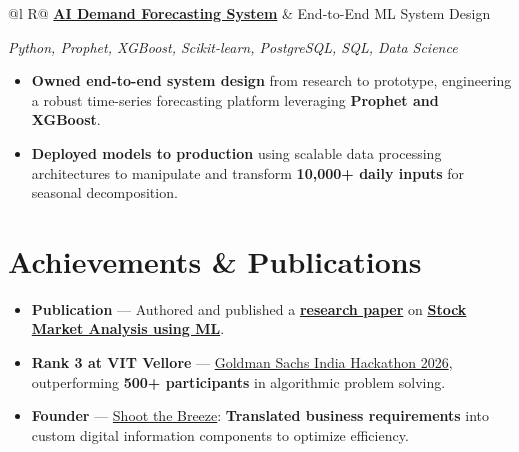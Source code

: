 \documentclass[a4paper,11pt]{article}
\newcommand{\subheading}[1]{\textbf{#1}}
\newcommand{\meta}[1]{{\fontsize{10}{12}\selectfont\textcolor[HTML]{3A3A3A}{#1}}}
\newcommand{\techstack}[1]{{\fontsize{10}{12}\selectfont\textcolor[HTML]{1A1A1A}{\textit{#1}}}}
\newcommand{\ulink}[2]{\href{#1}{#2}}
\begin{document}
\begin{tabularx}{\linewidth}{@{}l R@{}}
\subheading{\ulink{https://github.com/su-jin1425/Demand-Forecasting-System}{AI Demand Forecasting System}} & \meta{End-to-End ML System Design}
\end{tabularx}
\techstack{Python, Prophet, XGBoost, Scikit-learn, PostgreSQL, SQL, Data Science}
\begin{itemize}[nosep, leftmargin=1.5em, itemsep=2pt, topsep=2pt]
  \item {\color[HTML]{0A0A0A}\fontsize{11}{14}\selectfont \textbf{Owned end-to-end system design} from research to prototype, engineering a robust time-series forecasting platform leveraging \textbf{Prophet and XGBoost}.}
  \item {\color[HTML]{0A0A0A}\fontsize{11}{14}\selectfont \textbf{Deployed models to production} using scalable data processing architectures to manipulate and transform \textbf{10,000+ daily inputs} for seasonal decomposition.}
\end{itemize}

\section{Achievements \& Publications}
\vspace{2pt}

\begin{itemize}[nosep, leftmargin=1.5em, itemsep=2pt, topsep=2pt]
  \item {\color[HTML]{0A0A0A}\fontsize{11}{14}\selectfont \textbf{Publication} --- Authored and published a \ulink{https://www.elruha.org/_files/ugd/614b1f_6b95e1b697bf452b9907ba46e0151c05.pdf\#page=774}{\textbf{research paper}} on \ulink{https://github.com/su-jin1425/Set-Project}{\textbf{Stock Market Analysis using ML}}.}
  \item {\color[HTML]{0A0A0A}\fontsize{11}{14}\selectfont \textbf{Rank 3 at VIT Vellore} --- \ulink{https://www.hackerrank.com/contests/goldman-sachs-india-hackathon-2026-cs/leaderboard}{Goldman Sachs India Hackathon 2026}, outperforming \textbf{500+ participants} in algorithmic problem solving.}
  \item {\color[HTML]{0A0A0A}\fontsize{11}{14}\selectfont \textbf{Founder} --- \ulink{https://shoot-the-breeze.vercel.app}{Shoot the Breeze}: \textbf{Translated business requirements} into custom digital information components to optimize efficiency.}
\end{itemize}
\end{document}
